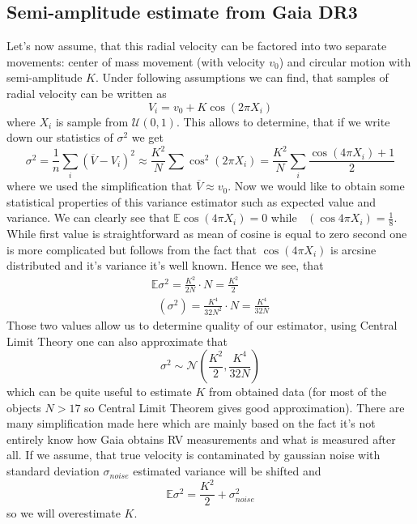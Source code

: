 \documentclass{pracalicmgr}
\DeclareMathOperator{\Var}{\widehat{Var}}
\begin{document}
 

\begin{appendices}
    \chapter{Semi-amplitude estimate from Gaia DR3}
    Let's now assume, that this radial velocity can be factored into two separate movements: center of mass movement (with velocity $v_0$) and circular motion with semi-amplitude $K$. Under following 
assumptions we can find, that samples of radial velocity can be written as 
\begin{equation}
    V_i=v_0+K\cos{(2\pi X_i)}
\end{equation}
where $X_i$ is sample from $\mathcal{U}(0,1)$. This allows to determine, that if we write down our statistics of $\sigma^2$ we get 
\begin{equation}
    \sigma^2=\frac{1}{n}\sum_i (\overline{V}-V_i)^2\approx \frac{K^2}{N}\sum \cos^2{(2\pi X_i)}=\frac{K^2}{N}\sum_i \frac{\cos{(4\pi X_i)}+1}{2}
\end{equation}
where we used the simplification that $\overline{V}\approx v_0$. Now we would like to obtain some statistical properties of this variance estimator such as expected value and variance.
We can clearly see that $\mathbb{E}\cos{(4\pi X_i)}=0$ while $\Var(\cos{4\pi X_i})=\frac{1}{8}$. While first value is straightforward as mean of cosine is equal to zero second one 
is more complicated but follows from the fact that $\cos{(4\pi X_i)}$ is arcsine distributed and it's variance it's well known. Hence we see, that 
\begin{align}\label{semi}
    \mathbb{E} \sigma^2 = \frac{K^2}{2N}\cdot N = \frac{K^2}{2}\\ 
    \Var (\sigma^2) = \frac{K^4}{32N^2}\cdot N = \frac{K^4}{32N}
\end{align} 
Those two values allow us to determine quality of our estimator, using Central Limit Theory one can also approximate that 
\begin{equation}
    \sigma^2 \sim \mathcal{N}\left(\frac{K^2}{2},\frac{K^4}{32N}\right)
\end{equation}
which can be quite useful to estimate $K$ from obtained data (for most of the objects $N>17$ so Central Limit Theorem gives good approximation).
There are many simplification made here which are mainly based on the fact it's not entirely know how Gaia obtains RV measurements and what is measured after all.
If we assume, that true velocity is contaminated by gaussian noise with standard deviation $\sigma_{noise}$ estimated variance will be shifted and 
\begin{equation}
    \mathbb{E} \sigma^2 = \frac{K^2}{2}+\sigma_{noise}^2
\end{equation} 
so we will overestimate $K$.
    \end{appendices}
\end{document}
